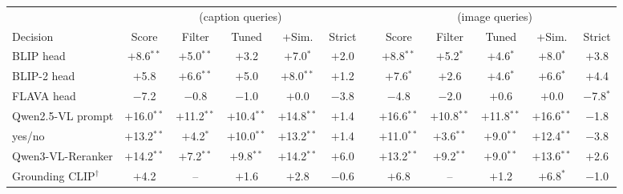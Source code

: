 \begin{tabular}{l ccccc c ccccc}
\toprule
& \multicolumn{5}{c}{\ttoi{} (caption queries)} & & \multicolumn{5}{c}{\itot{} (image queries)}\\
\cmidrule(lr){2-6}\cmidrule(lr){8-12}
Decision & Score & Filter & Tuned & +Sim. & Strict & & Score & Filter & Tuned & +Sim. & Strict\\
\midrule
BLIP head & $+$8.6$^{**}$ & $+$5.0$^{**}$ & $+$3.2 & $+$7.0$^{*}$ & $+$2.0 &  & $+$8.8$^{**}$ & $+$5.2$^{*}$ & $+$4.6$^{*}$ & $+$8.0$^{*}$ & $+$3.8 \\
BLIP-2 head & $+$5.8 & $+$6.6$^{**}$ & $+$5.0 & $+$8.0$^{**}$ & $+$1.2 &  & $+$7.6$^{*}$ & $+$2.6 & $+$4.6$^{*}$ & $+$6.6$^{*}$ & $+$4.4 \\
FLAVA head & $-$7.2 & $-$0.8 & $-$1.0 & $+$0.0 & $-$3.8 &  & $-$4.8 & $-$2.0 & $+$0.6 & $+$0.0 & $-$7.8$^{*}$ \\
Qwen2.5-VL prompt & $+$16.0$^{**}$ & $+$11.2$^{**}$ & $+$10.4$^{**}$ & $+$14.8$^{**}$ & $+$1.4 &  & $+$16.6$^{**}$ & $+$10.8$^{**}$ & $+$11.8$^{**}$ & $+$16.6$^{**}$ & $-$1.8 \\
\qemb{} yes/no & $+$13.2$^{**}$ & $+$4.2$^{*}$ & $+$10.0$^{**}$ & $+$13.2$^{**}$ & $+$1.4 &  & $+$11.0$^{**}$ & $+$3.6$^{**}$ & $+$9.0$^{**}$ & $+$12.4$^{**}$ & $-$3.8 \\
Qwen3-VL-Reranker & $+$14.2$^{**}$ & $+$7.2$^{**}$ & $+$9.8$^{**}$ & $+$14.2$^{**}$ & $+$6.0 &  & $+$13.2$^{**}$ & $+$9.2$^{**}$ & $+$9.0$^{**}$ & $+$13.6$^{**}$ & $+$2.6 \\
Grounding CLIP$^{\dagger}$ & $+$4.2 & -- & $+$1.6 & $+$2.8 & $-$0.6 &  & $+$6.8 & -- & $+$1.2 & $+$6.8$^{*}$ & $-$1.0 \\
\bottomrule
\end{tabular}
